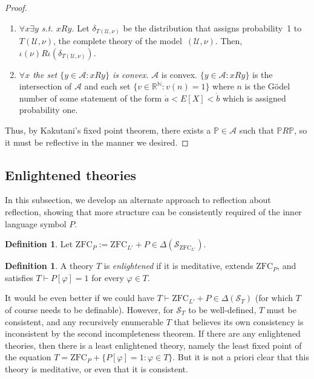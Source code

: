 \documentclass[12pt]{article}
\newcommand{\PP}{\mathbb{P}}
\newcommand{\vp}{\varphi}
\newcommand{\RR}{\mathbb{R}}
\newcommand{\NN}{\mathbb{N}}
\newcommand{\zfc}{\mathrm{ZFC}}
\newcommand{\zfcl}{{\zfc_{\cL}}}
\newcommand{\zfcp}{{\zfc_P}}
\newcommand{\cA}{\mathcal{A}}
\newcommand{\cL}{L'}
\newcommand{\cS}{\mathcal{S}}
\newcommand{\cU}{\mathcal{U}}
\theoremstyle{plain}
\theoremstyle{definition}
\newtheorem{definition}[theorem]{Definition}
\theoremstyle{remark}
\begin{document}
\begin{proof}
\begin{enumerate}
\item \emph{$\forall x \exists y$ s.t. $xRy$.} Let $\delta_{T(\cU,\nu)}$ be the distribution that assigns probability~1 to~$T(\cU,\nu)$, the complete theory of the model~$(\cU,\nu)$. Then, $\iota(\nu)R\iota(\delta_{T(\cU,\nu)})$.

\item \emph{$\forall x$ the set $\{y \in \mathcal{A}: xRy\}$ is convex.} $\cA$ is convex. $\{y\in\cA:xRy\}$ is the intersection of $\cA$ and each set $\{v\in\RR^\NN : v(n) = 1\}$ where $n$ is the G\"odel number of some statement of the form $\dot a < E[X]<\dot b$ which is assigned probability one.
\end{enumerate}
Thus, by Kakutani's fixed point theorem, there exists a $\PP\in\cA$ such that 
$\PP R\PP$, so it must be reflective in the manner we desired.

\end{proof}
\subsection{Enlightened theories}
In this subsection, we develop an alternate approach to reflection about reflection, showing that more structure can be consistently required of the inner language symbol $P$.
\begin{definition}
Let $\zfcp := \zfcl + P\in\Delta(\cS_\zfcl)$.
\end{definition}
\begin{definition}
A theory $T$ is \emph{enlightened} if it is meditative, extends $\zfcp$, and satisfies $T\vdash P[\vp] = 1$ for every $\vp\in T$.
\end{definition}
It would be even better if we could have $T\vdash\zfcl + P\in\Delta(\cS_T)$ (for which $T$ of course needs to be definable). However, for $\cS_T$ to be well-defined, $T$ must be consistent, and any recursively enumerable $T$ that believes its own consistency is inconsistent by the second incompleteness theorem.
If there are any enlightened theories, then there is a least enlightened theory, namely the least fixed point of the equation $T = \zfcp + \{P[\vp] = 1 : \vp\in T\}$. But it is not a priori clear that this theory is meditative, or even that it is consistent. 
\end{document}
